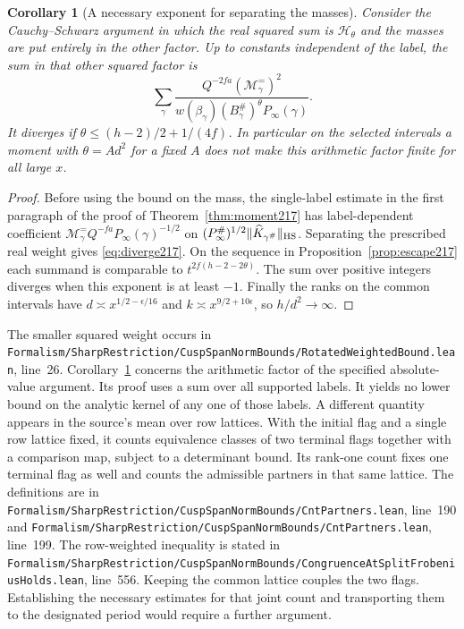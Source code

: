 \documentclass[a4paper,11pt]{article}
\newtheorem{corollary}[proposition]{Corollary}
\theoremstyle{definition}
\theoremstyle{remark}
\newcommand{\srcloc}[2]{{\small\nolinkurl{#1.lean}}, line~#2}
\numberwithin{equation}{section}
\begin{document}
\begin{corollary}[A necessary exponent for separating the masses]
\leavevmode\label{cor:diverge217}
Consider the Cauchy--Schwarz argument in which the real squared
sum is \(\mathcal H_\theta\) and the masses are put entirely
in the other factor. Up to constants independent of the label,
the sum in that other squared factor is
\begin{equation}
 \sum_{\gamma}
  \frac{Q^{-2fa}(\mathcal M_\gamma^{=})^2}
       {w(\beta_\gamma)(B_\gamma^\#)^\theta P_\infty(\gamma)} .
 \label{eq:diverge217}
\end{equation}
It diverges if
\(\theta\le(h-2)/2+1/(4f)\). In particular on the selected
intervals a moment with \(\theta=A d^2\) for a fixed \(A\)
does not make this arithmetic factor finite for all large \(x\).
\end{corollary}
\begin{proof}
Before using the bound on the mass, the single-label estimate
in the first paragraph of the proof of Theorem~\ref{thm:moment217}
has label-dependent coefficient
\(\mathcal M_\gamma^{=}Q^{-fa}P_\infty(\gamma)^{-1/2}\)
on \((P_\infty^\#)^{1/2}\|\widehat K_{\gamma^\#}\|_{\rm HS}\).
Separating the prescribed real weight gives \eqref{eq:diverge217}.
On the sequence in Proposition~\ref{prop:escape217} each summand
is comparable to \(t^{2f(h-2-2\theta)}\). The sum over positive
integers diverges when this exponent is at least \(-1\). Finally
the ranks on the common intervals have \(d\asymp x^{1/2-\epsilon/16}\)
and \(k\asymp x^{9/2+10\epsilon}\), so \(h/d^2\to\infty\).
\end{proof}

The smaller squared weight occurs in
\srcloc{Formalism/SharpRestriction/CuspSpanNormBounds/RotatedWeightedBound}{26}.
Corollary~\ref{cor:diverge217} concerns the arithmetic factor
of the specified absolute-value argument. Its proof uses a sum
over all supported labels. It yields no lower bound on the
analytic kernel of any one of those labels. A different
quantity appears in the source's mean over row lattices. With
the initial flag and a single row lattice fixed, it counts
equivalence classes of two terminal flags together with a
comparison map, subject to a determinant bound. Its rank-one
count fixes one terminal flag as well and counts the admissible
partners in that same lattice. The definitions are in
\srcloc{Formalism/SharpRestriction/CuspSpanNormBounds/CntPartners}{190}
and \srcloc{Formalism/SharpRestriction/CuspSpanNormBounds/CntPartners}{199}.
The row-weighted inequality is stated in
\srcloc{Formalism/SharpRestriction/CuspSpanNormBounds/CongruenceAtSplitFrobeniusHolds}{556}.
Keeping the common lattice couples the two flags. Establishing
the necessary estimates for that joint count and transporting
them to the designated period would require a further argument.
\end{document}
